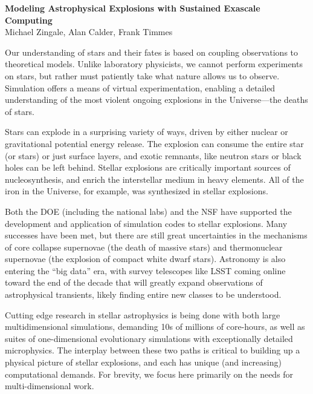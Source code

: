 \documentclass[11pt,twocolumn]{article}
\begin{document}
\begin{center}
{\sffamily \bfseries Modeling Astrophysical Explosions with Sustained Exascale Computing\footnotemark[1]} \\
Michael Zingale\footnotemark[2], Alan Calder\footnotemark[2], Frank Timmes\footnotemark[3]
\end{center}
%

Our understanding of stars and their fates is based on coupling
observations to theoretical models.  Unlike laboratory physicists, we
cannot perform experiments on stars, but rather must
patiently take what nature allows us to observe.  Simulation offers a means
of virtual experimentation, enabling a detailed understanding of the
most violent ongoing explosions in the Universe---the deaths of stars.

Stars can explode in a surprising variety of ways, driven by either
nuclear or gravitational potential energy release.  The
explosion can consume the entire star (or stars) or just
surface layers, and exotic remnants, like neutron stars or black holes
can be left behind.  Stellar explosions are critically important sources of 
nucleosynthesis, and enrich the interstellar medium in heavy elements. 
All of the iron in the Universe, for example, was synthesized in 
stellar explosions.

Both the DOE (including the national labs) and the 
NSF have supported the development and application of simulation codes
to stellar explosions.  Many successes have been met, but there are
still great uncertainties in the mechanisms of core collapse
supernovae (the death of massive stars) and thermonuclear supernovae
(the explosion of compact white dwarf stars).  Astronomy is also
entering the ``big data'' era, with survey telescopes 
like LSST coming online toward the end of the decade that will greatly 
expand observations of astrophysical transients, likely finding entire 
new classes to be understood.

Cutting edge research in stellar astrophysics is being done with both
large multidimensional simulations, demanding 10s of millions of
core-hours, as well as suites of one-dimensional evolutionary
simulations with exceptionally detailed microphysics.  The interplay
between these two paths is critical to building up a physical picture
of stellar explosions, and each has unique (and increasing)
computational demands.  For brevity, we focus here primarily on the 
needs for multi-dimensional work.
\end{document}
